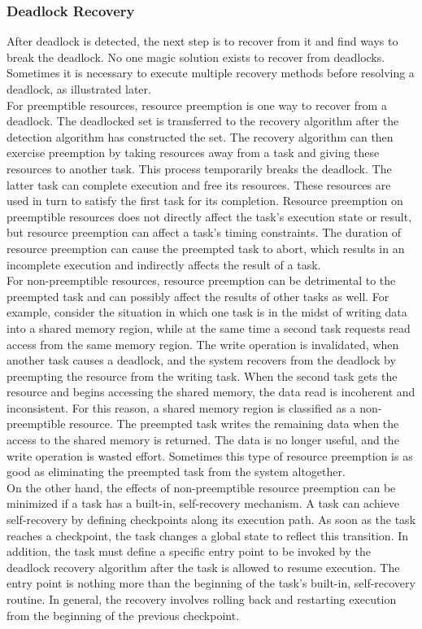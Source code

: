 \documentclass[12pt]{article}
\begin{document}
\subsubsection{Deadlock Recovery}

After deadlock is detected, the next step is to recover from it and find ways to break the deadlock. No one magic solution exists to recover from deadlocks. Sometimes it is necessary to execute multiple recovery methods before resolving a deadlock, as illustrated later.\\
For preemptible resources, resource preemption is one way to recover from a deadlock. The deadlocked set is transferred to the recovery algorithm after the detection algorithm has constructed the set. The recovery algorithm can then exercise preemption by taking resources away from a task and giving these resources to another task. This process temporarily breaks the deadlock. The latter task can complete execution and free its resources. These resources are used in turn to satisfy the first task for its completion. Resource preemption on preemptible resources does not directly affect the task's execution state or result, but resource preemption can affect a task's timing constraints. The duration of resource preemption can cause the preempted task to abort, which results in an incomplete execution and indirectly affects the result of a task.\\
For non-preemptible resources, resource preemption can be detrimental to the preempted task and can possibly affect the results of other tasks as well. For example, consider the situation in which one task is in the midst of writing data into a shared memory region, while at the same time a second task requests read access from the same memory region. The write operation is invalidated, when another task causes a deadlock, and the system recovers from the deadlock by preempting the resource from the writing task. When the second task gets the resource and begins accessing the shared memory, the data read is incoherent and inconsistent. For this reason, a shared memory region is classified as a non-preemptible resource. The preempted task writes the remaining data when the access to the shared memory is returned. The data is no longer useful, and the write operation is wasted effort. Sometimes this type of resource preemption is as good as eliminating the preempted task from the system altogether.\\
On the other hand, the effects of non-preemptible resource preemption can be minimized if a task has a built-in, self-recovery mechanism. A task can achieve self-recovery by defining checkpoints along its execution path. As soon as the task reaches a checkpoint, the task changes a global state to reflect this transition. In addition, the task must define a specific entry point to be invoked by the deadlock recovery algorithm after the task is allowed to resume execution. The entry point is nothing more than the beginning of the task's built-in, self-recovery routine. In general, the recovery involves rolling back and restarting execution from the beginning of the previous checkpoint.
\end{document}
